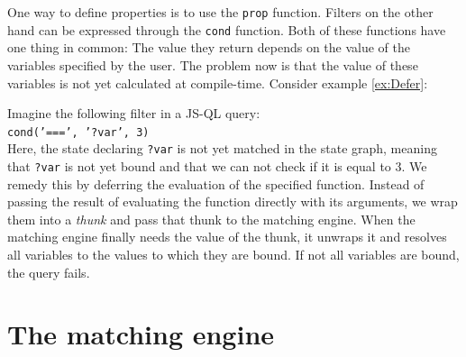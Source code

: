 One way to define properties is to use the \texttt{prop} function. Filters on the other hand can be expressed through the \texttt{cond} function. Both of these functions have one thing in common: The value they return depends on the value of the variables specified by the user. The problem now is that the value of these variables is not yet calculated at compile-time. 
Consider example \ref{ex:Defer}:
\begin{exmp}
\label{ex:Defer}
Imagine the following filter in a JS-QL query: \\\texttt{cond('===', '?var', 3)} \\Here, the state declaring \texttt{?var} is not yet matched in the state graph, meaning that \texttt{?var} is not yet bound and that we can not check if it is equal to 3. We remedy this by deferring the evaluation of the specified function. Instead of passing the result of evaluating the function directly with its arguments, we wrap them into a \textit{thunk} and pass that thunk to the matching engine. When the matching engine finally needs the value of the thunk, it unwraps it and resolves all variables to the values to which they are bound. If not all variables are bound, the query fails.
\end{exmp}

\section{The matching engine}
\label{sec:matchingEngine}

